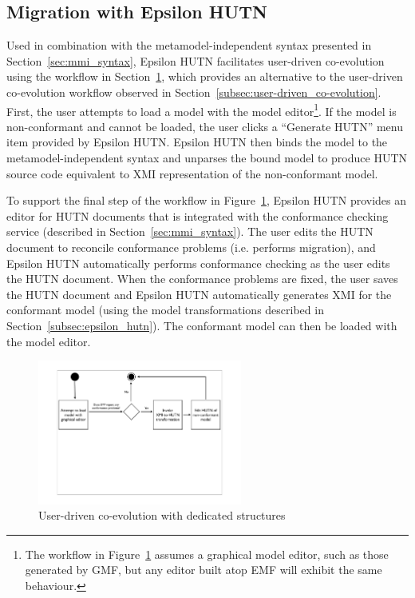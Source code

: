 \subsection{Migration with Epsilon HUTN}
\label{subsec:migration_with_hutn}
Used in combination with the metamodel-independent syntax presented in Section~\ref{sec:mmi_syntax}, Epsilon HUTN facilitates user-driven co-evolution using the workflow in Section~\ref{fig:hutn_process_implementation}, which provides an alternative to the user-driven co-evolution workflow observed in Section~\ref{subsec:user-driven_co-evolution}. First, the user attempts to load a model with the model editor\footnote{The workflow in Figure~\ref{fig:hutn_process_implementation} assumes a graphical model editor, such as those generated by GMF, but any editor built atop EMF will exhibit the same behaviour.}. If the model is non-conformant and cannot be loaded, the user clicks a ``Generate HUTN'' menu item provided by Epsilon HUTN. Epsilon HUTN then binds the model to the metamodel-independent syntax and unparses the bound model to produce HUTN source code equivalent to XMI representation of the non-conformant model.

To support the final step of the workflow in Figure~\ref{fig:hutn_process_implementation}, Epsilon HUTN provides an editor for HUTN documents that is integrated with the conformance checking service (described in Section~\ref{sec:mmi_syntax}). The user edits the HUTN document to reconcile conformance problems (i.e. performs migration), and Epsilon HUTN automatically performs conformance checking as the user edits the HUTN document. When the conformance problems are fixed, the user saves the HUTN document and Epsilon HUTN automatically generates XMI for the conformant model (using the model transformations described in Section~\ref{subsec:epsilon_hutn}). The conformant model can then be loaded with the model editor.

\begin{figure}[htbp]
	\centering
	\includegraphics*[viewport=80 290 760 550,height=4.75cm]{6.Evaluation/images/user_driven/hutn_process.pdf}
	\caption{User-driven co-evolution with dedicated structures}
	\label{fig:hutn_process_implementation}
\end{figure}

